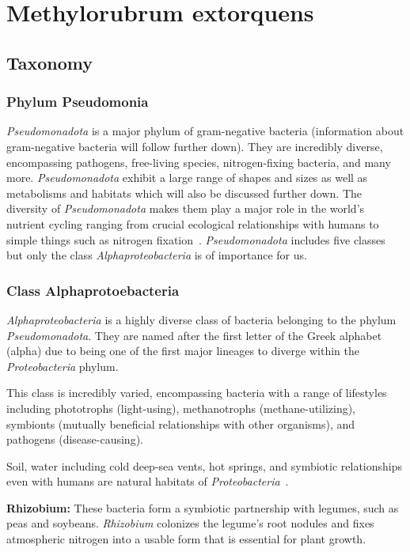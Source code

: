 \chapter{Methylorubrum extorquens}


\section{Taxonomy\authorB{}}

\subsection{Phylum Pseudomonia}
\emph{Pseudomonadota} is a major phylum of gram-negative bacteria (information about gram-negative bacteria will follow further down).
They are incredibly diverse, encompassing
pathogens, free-living species, nitrogen-fixing bacteria, and many more.
\emph{Pseudomonadota} exhibit a large range of shapes and sizes as well as metabolisms and
habitats which will also be discussed further down.
The diversity of \emph{Pseudomonadota} makes them play a major role in the world's nutrient cycling ranging from crucial ecological relationships with humans to simple things such as nitrogen fixation~\cite{pseudomonadota}.
\emph{Pseudomonadota} includes five classes but only the class \emph{Alphaproteobacteria} is of importance for us.

\subsection{Class Alphaprotoebacteria}
\emph{Alphaproteobacteria} is a highly diverse class of bacteria belonging to the phylum \emph{Pseudomonadota}.
They are named after the first letter of the Greek alphabet (alpha) due to being one of the first major lineages to diverge within the \emph{Proteobacteria} phylum.

This class is incredibly varied, encompassing bacteria with a range of lifestyles including phototrophs (light-using), methanotrophs (methane-utilizing), symbionts (mutually beneficial relationships with other organisms), and pathogens (disease-causing).

Soil, water including cold deep-sea vents, hot springs, and symbiotic relationships even
with humans are natural habitats of \emph{Proteobacteria}~\cite{gammaproteobacteria}.

\textbf{Rhizobium:} These bacteria form a symbiotic partnership with legumes, such as peas and soybeans.
\emph{Rhizobium} colonizes the legume's root nodules and fixes atmospheric nitrogen into a usable form that is essential for plant growth.

